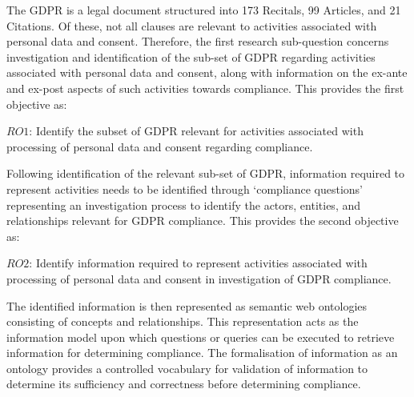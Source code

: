 The GDPR is a legal document structured into 173 Recitals, 99 Articles, and 21 Citations. Of these, not all clauses are relevant to activities associated with personal data and consent. Therefore, the first research sub-question concerns investigation and identification of the sub-set of GDPR regarding activities associated with personal data and consent, along with information on the ex-ante and ex-post aspects of such activities towards compliance. This provides the first objective as:
\begin{framed}
$RO1$: Identify the subset of GDPR relevant for activities associated with processing of personal data and consent regarding compliance.
\end{framed}

Following identification of the relevant sub-set of GDPR, information required to represent activities needs to be identified through `compliance questions' representing an investigation process to identify the actors, entities, and relationships relevant for GDPR compliance. This provides the second objective as:
\begin{framed}
$RO2$: Identify information required to represent activities associated with processing of personal data and consent in investigation of GDPR compliance.
\end{framed}

The identified information is then represented as semantic web ontologies consisting of concepts and relationships. This representation acts as the information model upon which questions or queries can be executed to retrieve information for determining compliance. The formalisation of information as an ontology provides a controlled vocabulary for validation of information to determine its sufficiency and correctness before determining compliance. 


